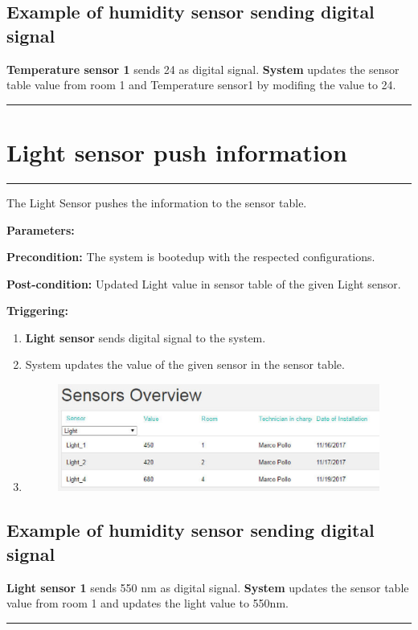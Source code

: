 \subsection{Example of humidity sensor sending digital signal}
\textbf{Temperature sensor 1} sends 24 as digital signal. \textbf{System}
updates the sensor table value from room 1 and Temperature sensor1 by modifing
the value to 24.
\hfill
\vspace{0.5cm}
\hrule

\break
\section{Light sensor push information}

\hrule
\hfill
\vspace{0.5cm}
\label{operation:Light sensor push information}

The  Light Sensor pushes the information to the sensor table.
\begin{description}
\item \textbf{Parameters:} 
\item \textbf{Precondition:} The system is bootedup with the respected
configurations.
\item \textbf{Post-condition:} Updated Light value in sensor table of the given
Light sensor.

\item \textbf{Triggering:}
\begin{enumerate}
\item \textbf{Light sensor} sends digital signal to the system.
\item System updates the value of the given sensor in the sensor table.
\item \begin{figure}[H]
\includegraphics[width=1\textwidth]{images/LightSensor.eps}
\end{figure}
\end{enumerate}
\end{description}

\subsection{Example of humidity sensor sending digital signal}
\textbf{Light sensor 1} sends 550 nm as digital signal. \textbf{System}
updates the sensor table value from room 1 and updates the light value to 550nm.
\hfill
\vspace{0.5cm}
\hrule


